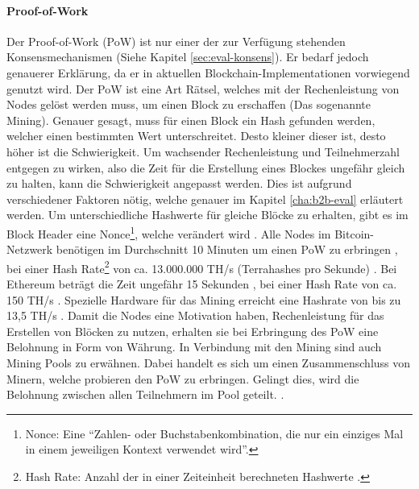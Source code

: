 \paragraph{Proof-of-Work}
Der Proof-of-Work (PoW) ist nur einer der zur Verfügung stehenden Konsensmechanismen (Siehe Kapitel \ref{sec:eval-konsens}). Er bedarf jedoch genauerer Erklärung, da er in aktuellen Blockchain-Implementationen vorwiegend genutzt wird. Der PoW ist eine Art Rätsel, welches mit der Rechenleistung von Nodes gelöst werden muss, um einen Block zu erschaffen (Das sogenannte Mining). Genauer gesagt, muss für einen Block ein Hash gefunden werden, welcher einen bestimmten Wert unterschreitet. Desto kleiner dieser ist, desto höher ist die Schwierigkeit. Um wachsender Rechenleistung und Teilnehmerzahl entgegen zu wirken, also die Zeit für die Erstellung eines Blockes ungefähr gleich zu halten, kann die Schwierigkeit angepasst werden. Dies ist aufgrund verschiedener Faktoren nötig, welche genauer im Kapitel \ref{cha:b2b-eval} erläutert werden. Um unterschiedliche Hashwerte für gleiche Blöcke zu erhalten, gibt es im Block Header eine Nonce\footnote{Nonce: Eine ``Zahlen- oder Buchstabenkombination, die nur ein einziges Mal in einem jeweiligen Kontext verwendet wird''\cite{AntonopoulosMasteringbitcoin2015}.}, welche verändert wird \cite{NakamotoBitcoinPeertoPeerElectronic2008}. Alle Nodes im Bitcoin-Netzwerk benötigen im Durchschnitt 10 Minuten um einen PoW zu erbringen \cite{AntonopoulosMasteringbitcoin2015}, bei einer Hash Rate\footnote{Hash Rate: Anzahl der in einer Zeiteinheit berechneten Hashwerte \cite{BitcoinTeamBitcoinGlossar}.} von ca. 13.000.000 TH/s (Terrahashes pro Sekunde) \cite{EtherscanEthereumNetworkHashRate}. Bei Ethereum beträgt die Zeit ungefähr 15 Sekunden \cite{EtherscanEthereumAverageBlockTime}, bei einer Hash Rate von ca. 150 TH/s \cite{EtherscanEthereumNetworkHashRate}. Spezielle Hardware für das Mining erreicht eine Hashrate von bis zu 13,5 TH/s \cite{BitcoinminingLearnBitcoinmining}. Damit die Nodes eine Motivation haben, Rechenleistung für das Erstellen von Blöcken zu nutzen, erhalten sie bei Erbringung des PoW eine Belohnung in Form von Währung. In Verbindung mit den Mining sind auch Mining Pools zu erwähnen. Dabei handelt es sich um einen Zusammenschluss von Minern, welche probieren den PoW zu erbringen. Gelingt dies, wird die Belohnung zwischen allen Teilnehmern im Pool geteilt.  \cite{NakamotoBitcoinPeertoPeerElectronic2008} \cite{EthereumTeamEthereumWhitePaper2017}. 

